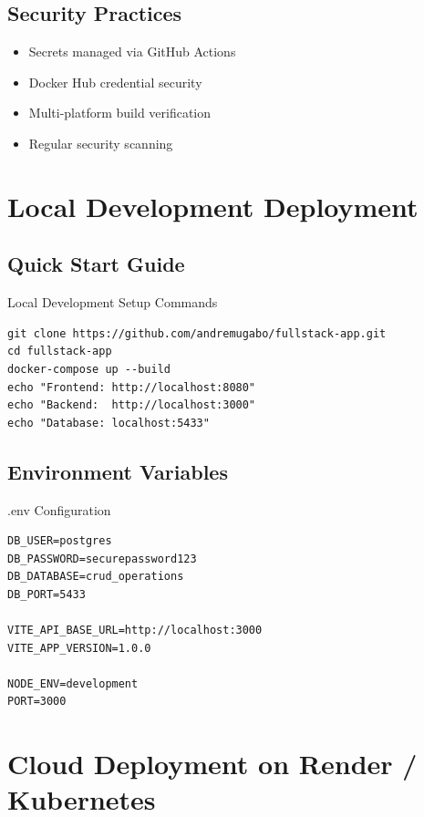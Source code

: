 \documentclass[12pt]{article}
\begin{document}
\subsection{Security Practices}
\begin{itemize}
  \item \textcolor{green}{\faLock} Secrets managed via GitHub Actions
  \item \textcolor{green}{\faLock} Docker Hub credential security
  \item \textcolor{green}{\faLock} Multi-platform build verification
  \item \textcolor{green}{\faLock} Regular security scanning
\end{itemize}

\section{Local Development Deployment}

\subsection{Quick Start Guide}
\begin{codebox}{Local Development Setup Commands}
\begin{lstlisting}
git clone https://github.com/andremugabo/fullstack-app.git
cd fullstack-app
docker-compose up --build
echo "Frontend: http://localhost:8080"
echo "Backend:  http://localhost:3000"
echo "Database: localhost:5433"
\end{lstlisting}
\end{codebox}

\subsection{Environment Variables}
\begin{codebox}{.env Configuration}
\begin{lstlisting}
DB_USER=postgres
DB_PASSWORD=securepassword123
DB_DATABASE=crud_operations
DB_PORT=5433

VITE_API_BASE_URL=http://localhost:3000
VITE_APP_VERSION=1.0.0

NODE_ENV=development
PORT=3000
\end{lstlisting}
\end{codebox}

\section{Cloud Deployment on Render / Kubernetes}
\end{document}
